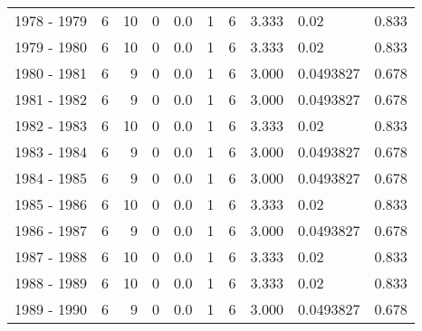 \begin{tabular}{lrrrrrrrlr}
1978 - 1979 &        6 &       10 &                 0 &               0.0 &                       1 &                          6 &       3.333 &       0.02 &             0.833 \\
1979 - 1980 &        6 &       10 &                 0 &               0.0 &                       1 &                          6 &       3.333 &       0.02 &             0.833 \\
1980 - 1981 &        6 &        9 &                 0 &               0.0 &                       1 &                          6 &       3.000 &  0.0493827 &             0.678 \\
1981 - 1982 &        6 &        9 &                 0 &               0.0 &                       1 &                          6 &       3.000 &  0.0493827 &             0.678 \\
1982 - 1983 &        6 &       10 &                 0 &               0.0 &                       1 &                          6 &       3.333 &       0.02 &             0.833 \\
1983 - 1984 &        6 &        9 &                 0 &               0.0 &                       1 &                          6 &       3.000 &  0.0493827 &             0.678 \\
1984 - 1985 &        6 &        9 &                 0 &               0.0 &                       1 &                          6 &       3.000 &  0.0493827 &             0.678 \\
1985 - 1986 &        6 &       10 &                 0 &               0.0 &                       1 &                          6 &       3.333 &       0.02 &             0.833 \\
1986 - 1987 &        6 &        9 &                 0 &               0.0 &                       1 &                          6 &       3.000 &  0.0493827 &             0.678 \\
1987 - 1988 &        6 &       10 &                 0 &               0.0 &                       1 &                          6 &       3.333 &       0.02 &             0.833 \\
1988 - 1989 &        6 &       10 &                 0 &               0.0 &                       1 &                          6 &       3.333 &       0.02 &             0.833 \\
1989 - 1990 &        6 &        9 &                 0 &               0.0 &                       1 &                          6 &       3.000 &  0.0493827 &             0.678 \\

\end{tabular}
